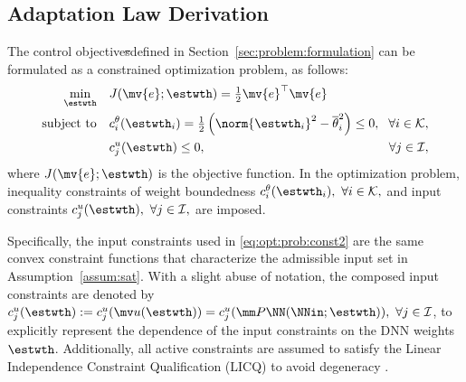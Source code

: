\documentclass[letterpaper, journal]{IEEEtran}
\providecommand{\DIFdel}[1]{{\protect\color{red}\sout{#1}}} %
\providecommand{\DIFdelbegin}{} %
\providecommand{\DIFdelend}{} %
\begin{document}
\subsection{Adaptation Law Derivation} \label{sec:main:result:sub:adap:laws}

The control objective\DIFdelbegin \DIFdel{s}\DIFdelend  defined in Section~\ref{sec:problem:formulation} can be formulated as a constrained optimization problem, as follows:
\begin{subequations} \label{eq:opt:prob} 
  \begin{align} 
    \min_{\estwth} \quad 
    & 
    J(\mv{e};\estwth)
    = 
    \tfrac{1}{2} \mv{e}^\top \mv{e} 
    &
    \label{eq:opt:prob:obj} 
    \\ 
    \text{subject to} \quad  
    & 
    c^{\theta}_i(\estwth_i)=\tfrac{1}{2}
    \left(
      \norm{\estwth_i}^2
      -
      \overline{\theta}_i^2 
    \right)
    \le 0, 
    \!
    &
    \!
    \forall i\in\mathcal{K} 
    ,
    \label{eq:opt:prob:const1} 
    \\ 
    & 
    c^{u}_j(\estwth)
    \le 0, 
    &
    \forall j\in\mathcal{I} 
    \label{eq:opt:prob:const2} 
    ,
  \end{align}%
\end{subequations}
where $J(\mv{e};\estwth)$ is the objective function.
In the optimization problem, inequality constraints of weight boundedness $c^{\theta}_i(\estwth_i),\ \forall i\in\mathcal{K},$ and input constraints $c^{u}_j(\estwth),\ \forall j\in\mathcal{I},$ are imposed.
\DIFdelbegin %
\DIFdelend 

Specifically, the input constraints used in \eqref{eq:opt:prob:const2} are the same convex constraint functions that characterize the admissible input set in Assumption~\ref{assum:sat}.
With a slight abuse of notation, the composed input constraints are denoted by
$c_j^u(\estwth):=c_j^u(\mv u(\estwth))=c_j^u(\mm P\NN(\NNin;\estwth)),\ \forall j\in\mathcal I$, to explicitly represent the dependence of the input constraints on the DNN weights $\estwth$.
Additionally, all active constraints are assumed to satisfy the Linear Independence Constraint Qualification (LICQ) to avoid degeneracy \cite[pp. 465--467]{Nocedal:2006aa}.
\end{document}
